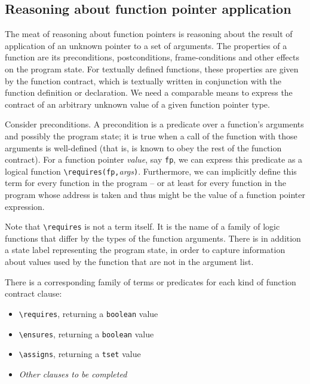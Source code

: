 \subsection{Reasoning about function pointer application}
\label{sec:fpreasoning}
The meat of reasoning about function pointers is reasoning about the result of application of an unknown pointer to a set of arguments.
The properties of a function are its
preconditions, postconditions, frame-conditions and other effects on the program state.
For textually defined functions, these properties are given by
the function contract, which is textually written in
conjunction with the function definition or declaration.
We need a comparable means to express the contract of an
arbitrary unknown value of a given function pointer type.

Consider preconditions.
A precondition is a predicate over a
function's arguments and possibly the program state; it is
true when a call of the function with those arguments is
well-defined (that is, is known to obey the rest of the function contract).
For a function pointer \emph{value}, say \lstinline|fp|, we can express this predicate as a logical function
\lstinline|\requires(fp,|\emph{args}\lstinline|)|.
Furthermore, we can implicitly define this term for every function in the program -- or at least for every function in the program whose address is taken and thus might be the value of a function pointer expression.

Note that \lstinline|\requires| is not a term itself. It is the name of a family of logic functions that differ by the types of the function arguments. There is in addition a state label representing the program state, in order to capture
information about values used by the function that are not in
the argument list.

There is a corresponding family of terms or predicates for each kind of function contract clause:
\begin{itemize}[noitemsep,nolistsep]
	\item \lstinline|\requires|, returning a \lstinline|boolean| value
	\item \lstinline|\ensures|, returning a \lstinline|boolean| value
	\item\lstinline|\assigns|, returning a \lstinline|tset| value
	\item \textit{Other clauses to be completed} 
\end{itemize}

